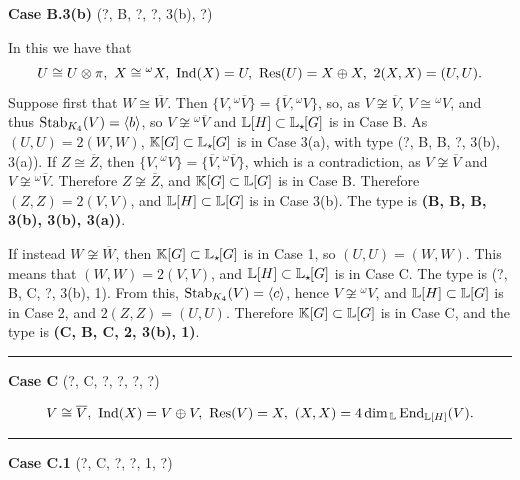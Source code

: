 \vspace{0.5em}
\noindent \textbf{Case B.3(b)} (?, B, ?, ?, 3(b), ?)

In this we have that
\[
U \cong U \otimes \pi, \ X \cong {}^{\omega} X, \ \Ind(X) = U, \ \Res(U) = X \oplus X, \ 2(X,X) = (U,U).
\]
Suppose first that $W \cong \overline{W}$. Then $\{V, {}^{\omega} \overline{V} \} = \{\overline{V}, {}^{\omega}V\}$, so, as $V \not\cong \overline{V}$, $V \cong {}^{\omega} V$, and thus $\operatorname{Stab}_{K_4}(V) = \langle b \rangle$, so $V \not\cong {}^{\omega} \overline{V}$ and ${\mathbb L}[H] \subset {\mathbb L}_{\star \hspace{-0.1em}}[G]$ is in Case B. As $(U,U) = 2(W,W)$, ${\mathbb K}[G] \subset {\mathbb L}_{\star \hspace{-0.1em}}[G]$ is in Case 3(a), with type (?, B, B, ?, 3(b), 3(a)). If $Z \cong \overline{Z}$, then $\{V, {}^{\omega} V \} = \{\overline{V}, {}^{\omega}\overline{V}\}$, which is a contradiction, as $V \not\cong \overline{V}$ and $V \not\cong {}^{\omega}\overline{V}$. Therefore $Z \not\cong \overline{Z}$, and ${\mathbb K}[G] \subset {\mathbb L}[G]$ is in Case B. Therefore $(Z,Z) = 2(V,V)$, and ${\mathbb L}[H] \subset {\mathbb L}[G]$ is in Case 3(b). The type is \textbf{(B, B, B, 3(b), 3(b), 3(a))}.

If instead $W \not\cong \overline{W}$, then ${\mathbb K}[G] \subset {\mathbb L}_{\star \hspace{-0.1em}}[G]$ is in Case 1, so $(U,U) = (W,W)$. This means that $(W,W) = 2(V,V)$, and ${\mathbb L}[H] \subset {\mathbb L}_{\star \hspace{-0.1em}}[G]$ is in Case C. The type is (?, B, C, ?, 3(b), 1). From this, $\operatorname{Stab}_{K_4}(V) = \langle c \rangle$, hence $V \not\cong {}^{\omega} V$, and ${\mathbb L}[H] \subset {\mathbb L}[G]$ is in Case 2, and $2(Z,Z) = (U,U)$. Therefore ${\mathbb K}[G] \subset {\mathbb L}[G]$ is in Case C, and the type is \textbf{(C, B, C, 2, 3(b), 1)}.

\vspace{0.5em}
\textcolor{gray}{\hrule}

\vspace{0.9em}
\begin{center}
    \large{\textbf{Case C} (?, C, ?, ?, ?, ?)}
\end{center}
\[
 V \cong \overline{V}, \ \Ind(X) = V \oplus V, \ \Res(V) = X, \ (X,X) = 4\dim_{\bbL} \End_{\bL[H]}(V).
\]
\vspace{-0.3em}
\textcolor{gray}{\hrule}
\vspace{0.5em}

\vspace{0.5em}
\noindent \textbf{Case C.1} (?, C, ?, ?, 1, ?)

